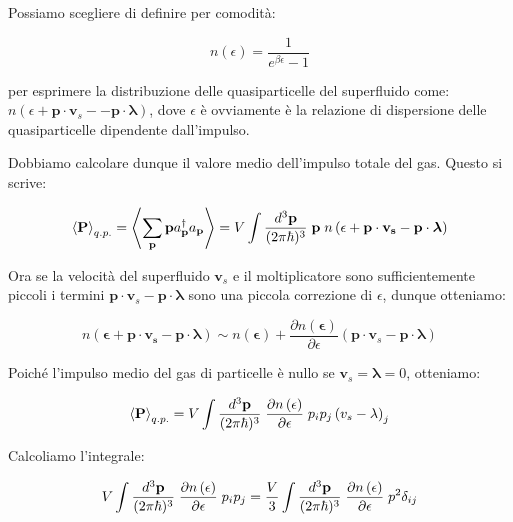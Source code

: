 \documentclass[12pt,a4paper]{article}
\begin{document}
{Possiamo scegliere di definire per comodità:

\[
n \left( \epsilon \right) = \frac{1}{e^{\beta \epsilon} - 1}
\]

per esprimere la distribuzione delle quasiparticelle del superfluido come:
$ n (\epsilon + \mathbf{p} \cdot \mathbf{v}_s -  - \mathbf{p} \cdot \boldsymbol{\lambda})$, dove $\epsilon$ è ovviamente è la relazione di dispersione delle quasiparticelle dipendente dall'impulso.

Dobbiamo calcolare dunque il valore medio dell'impulso totale del gas. Questo si scrive:

\begin{equation}
\left< \bold{P} \right>_{q.p.} = \left< \sum_{\mathbf{p}} \mathbf{p} a^{\dagger}_{\mathbf{p}} a_{\mathbf{p}} \right> = V \int \frac{d^3 \bold{p}}{( 2 \pi \hbar)^3} \; \mathbf{p} \; n \left( \mathbf{\epsilon + \mathbf{p} \cdot \mathbf{v}_s - \mathbf{p} \cdot \boldsymbol{\lambda}} \right) 
\end{equation}

Ora se la velocità del superfluido $\mathbf{v}_s$ e il moltiplicatore sono sufficientemente piccoli i termini $\mathbf{p} \cdot \mathbf{v}_s - \mathbf{p} \cdot \boldsymbol{\lambda}$ sono una piccola correzione di $\epsilon$, dunque otteniamo:

\[
n \left( \mathbf{\epsilon + \mathbf{p} \cdot \mathbf{v}_s - \mathbf{p} \cdot \boldsymbol{\lambda}} \right)  \sim n \left( \mathbf{\epsilon} \right) + \frac{\partial  n \left( \mathbf{\epsilon} \right)}{\partial \epsilon} \left( \mathbf{p} \cdot \mathbf{v}_s - \mathbf{p} \cdot \boldsymbol{\lambda} \right)
\]

Poiché l'impulso medio del gas di particelle è nullo se $\mathbf{v}_s = \boldsymbol{\lambda} = 0$, otteniamo:

\begin{equation}
\left< \bold{P} \right>_{q.p.} = V \int \frac{d^3 \bold{p}}{( 2 \pi \hbar)^3} \; \frac{\partial  n \left( \mathbf{\epsilon} \right)}{\partial \epsilon} \; p_i p_j \left( v_s - \lambda \right)_j
\end{equation}

Calcoliamo l'integrale:

\[
V \int \frac{d^3 \bold{p}}{( 2 \pi \hbar)^3} \; \frac{\partial  n \left( \mathbf{\epsilon} \right)}{\partial \epsilon} \; p_i p_j = \frac{V}{3}\int \frac{d^3 \bold{p}}{( 2 \pi \hbar)^3} \; \frac{\partial  n \left( \mathbf{\epsilon} \right)}{\partial \epsilon} \; p^2 \delta_{ij}
\]

}
\end{document}
